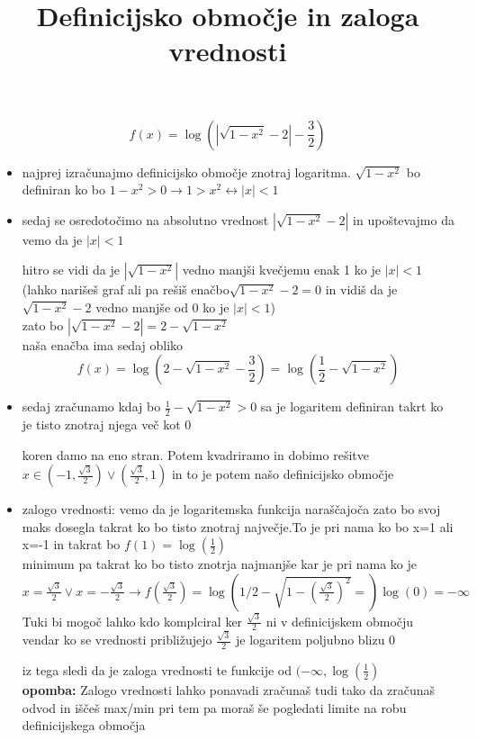\documentclass[a4paper]{article}
\begin{document}
\title{Definicijsko območje in zaloga vrednosti}
\maketitle
\[f(x)=\log(|\sqrt{1-x^2}-2|-\frac{3}{2})\]
\begin{itemize}

\item najprej izračunajmo definicijsko območje znotraj logaritma.
\(\sqrt{1-x^2}\) bo definiran ko bo $1-x^2>0\rightarrow 1>x^2\leftrightarrow |x|<1$
\\
\item sedaj se osredotočimo na absolutno vrednost $|\sqrt{1-x^2}-2|$ in upoštevajmo da vemo da je $|x|<1$

hitro se vidi da je $|\sqrt{1-x^2} |$ vedno manjši kvečjemu enak 1 ko je $|x|<1$ (lahko narišeš graf ali pa rešiš enačbo$\sqrt{1-x^2}-2=0$ in vidiš da je $\sqrt{1-x^2}-2$ vedno manjše od 0 ko je  $|x|<1$)\\
zato bo $|\sqrt{1-x^2}-2|=2-\sqrt{1-x^2}$
\\

naša enačba ima sedaj obliko\[f(x)=\log(2-\sqrt{1-x^2}-\frac{3}{2})=\log(\frac{1}{2}-\sqrt{1-x^2})\]

\item sedaj zračunamo kdaj bo $\frac{1}{2}-\sqrt{1-x^2}>0$ sa je logaritem definiran takrt ko je tisto znotraj njega več kot 0

koren damo na eno stran. Potem kvadriramo in dobimo rešitve $x\in(-1,\frac{\sqrt{3}}{2})\lor(\frac{\sqrt{3}}{2},1)$ in to je potem našo definicijsko območje

\item zalogo vrednosti: vemo da je logaritemska funkcija naraščajoča zato bo svoj maks dosegla takrat ko bo tisto znotraj največje.To je pri nama ko bo x=1 ali x=-1 in takrat bo $f(1)=\log(\frac{1}{2})$ \\
 minimum pa takrat ko bo tisto znotrja najmanjše kar je pri nama ko je $x=\frac{\sqrt{3}}{2}\lor x=-\frac{\sqrt{3}}{2}\rightarrow f(\frac{\sqrt{3}}{2})=\log(1/2-\sqrt{1-(\frac{\sqrt{3}}{2})^{2}} =)\log(0)=-\infty$ Tuki bi mogoč lahko kdo komplciral ker $\frac{\sqrt{3}}{2}$ ni v definicijskem območju vendar ko se vrednosti približujejo $\frac{\sqrt{3}}{2}$ je logaritem poljubno blizu 0
 
 iz tega sledi da je zaloga vrednosti te funkcije od $(-\infty,\log(\frac{1}{2})$\\

 \textbf{opomba: } Zalogo vrednosti lahko ponavadi zračunaš tudi tako da zračunaš odvod in iščeš max/min pri tem pa moraš še pogledati limite na robu definicijskega območja 


\end{itemize}
\end{document}
